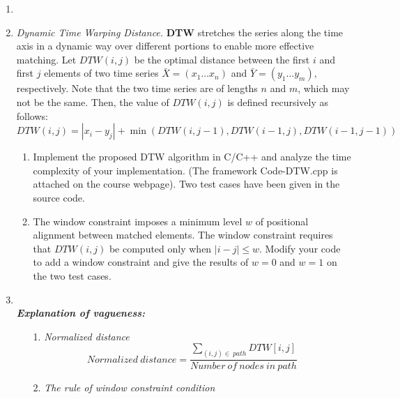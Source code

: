 \documentclass[12pt,a4paper]{article}
\makeatletter
\newtheorem*{solution}{Solution}
\theoremstyle{definition}
\renewenvironment{solution}[1][Solution] {\par\pushQED{\qed}\normalfont\topsep6\p@\@plus6\p@\relax\trivlist\item[\hskip\labelsep\bfseries#1\@addpunct{.}]\ignorespaces}{\popQED\endtrivlist\@endpefalse} \makeatother
\makeatother
\begin{document}
\begin{enumerate}
\begin{solution}
\begin{enumerate}
		        \end{enumerate} 
		    \end{solution}
		
		\item \textit{Dynamic Time Warping Distance.} \textbf{DTW} stretches the series along the time axis in a dynamic way over different
		portions to enable more effective matching. Let $D T W(i, j)$ be the optimal distance between the first $i$ and first $j$ elements of two time series $\bar{X}=\left(x_{1} \ldots x_{n}\right)$ and $\bar{Y}=\left(y_{1} \ldots y_{m}\right),$ respectively. Note that the two time series are of lengths $n$ and $m$, which may not be the same. Then, the value of $D T W(i, j)$ is defined recursively as follows:
		$$
		DTW(i, j)=\left|x_{i}- y_{j}\right|+\min(DTW(i, j-1), DTW(i-1, j), DTW(i-1, j-1))
		$$
		
		\begin{enumerate}
			\item Implement the proposed DTW algorithm in C/C++ and analyze the time complexity of your implementation. ({\color{blue}The framework Code-DTW.cpp is attached on the course webpage}). Two test cases have been given in the source code. 
			\item The window constraint imposes a minimum level $w$ of positional alignment between matched elements. The window constraint requires that $DTW(i, j)$ be computed only when $|i-j| \leq w$. Modify your code to add a window constraint and give the results of $ w=0 $ and $ w=1 $ on the two test cases. 
		\end{enumerate}
		    \begin{solution}
		    ~\\
		    \textbf{\textit{Explanation of vagueness:}}
		    \begin{enumerate}
		        \item [1.]\emph{Normalized distance} 
		        $$Normalized\ distance=\frac{\sum_{(i,j)\in \ path} DTW[i,j]}{Number\ of\ nodes\ in\ path}$$
		        \item [2.]\emph{The rule of window constraint condition}
		        

\end{enumerate}
\end{solution}
\end{enumerate}
\end{document}
